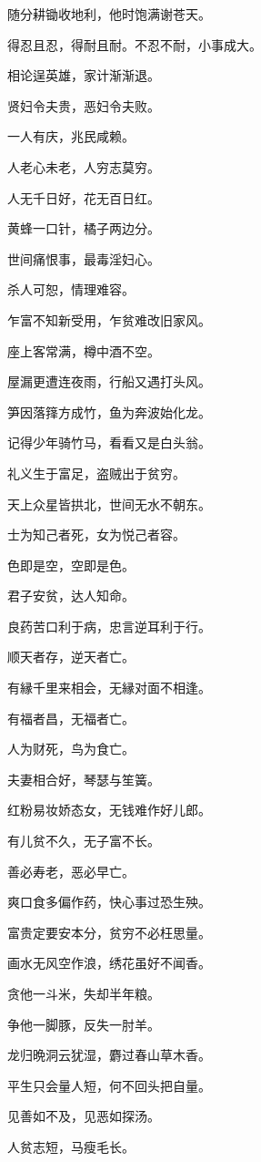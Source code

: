 \documentclass[12pt,oneside]{book}
\begin{document}
随分耕锄收地利，他时饱满谢苍天。

得忍且忍，得耐且耐。不忍不耐，小事成大。

相论逞英雄，家计渐渐退。

贤妇令夫贵，恶妇令夫败。

一人有庆，兆民咸赖。

人老心未老，人穷志莫穷。

人无千日好，花无百日红。

黄蜂一口针，橘子两边分。

世间痛恨事，最毒淫妇心。

杀人可恕，情理难容。

乍富不知新受用，乍贫难改旧家风。

座上客常满，樽中酒不空。

屋漏更遭连夜雨，行船又遇打头风。

笋因落箨方成竹，鱼为奔波始化龙。

记得少年骑竹马，看看又是白头翁。

礼义生于富足，盗贼出于贫穷。

天上众星皆拱北，世间无水不朝东。

士为知己者死，女为悦己者容。

色即是空，空即是色。

君子安贫，达人知命。

良药苦口利于病，忠言逆耳利于行。

顺天者存，逆天者亡。

有縁千里来相会，无縁对面不相逢。

有福者昌，无福者亡。

人为财死，鸟为食亡。

夫妻相合好，琴瑟与笙簧。

红粉易妆娇态女，无钱难作好儿郎。

有儿贫不久，无子富不长。

善必寿老，恶必早亡。

爽口食多偏作药，快心事过恐生殃。

富贵定要安本分，贫穷不必枉思量。

画水无风空作浪，绣花虽好不闻香。

贪他一斗米，失却半年粮。

争他一脚豚，反失一肘羊。

龙归晩洞云犹湿，麝过春山草木香。

平生只会量人短，何不回头把自量。

见善如不及，见恶如探汤。

人贫志短，马瘦毛长。
\end{document}
